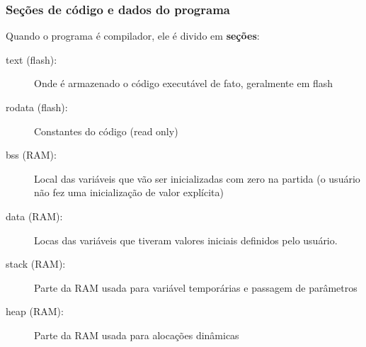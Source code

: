 \documentclass{beamer}
\begin{document}
\begin{frame}
	\frametitle{Seções de código e dados do programa}
    Quando o programa é compilador, ele é divido em \textbf{seções}:
    \begin{description}
    \item[text (flash):] Onde é armazenado o código executável de fato, geralmente em flash
    \item[rodata (flash):] Constantes do código (read only)
    \item[bss (RAM):] Local das variáveis que vão ser inicializadas com zero na partida (o usuário não fez uma inicialização de valor explícita)
    \item[data (RAM):] Locas das variáveis que tiveram valores iniciais definidos pelo usuário.
    \item[stack (RAM):] Parte da RAM usada para variável temporárias e passagem de parâmetros
    \item[heap (RAM):] Parte da RAM usada para alocações dinâmicas
    \end{description}
\end{frame}
\end{document}

